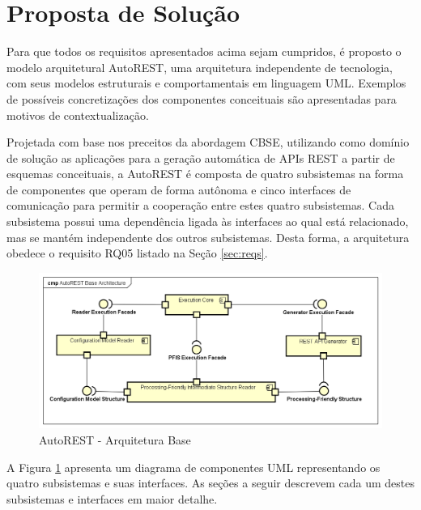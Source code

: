 
\section{Proposta de Solução}

Para que todos os requisitos apresentados acima sejam cumpridos, é proposto o modelo arquitetural AutoREST, uma arquitetura independente de tecnologia, com seus modelos estruturais e comportamentais em linguagem UML. Exemplos de possíveis concretizações dos componentes conceituais são apresentadas para motivos de contextualização.

Projetada com base nos preceitos da abordagem CBSE, utilizando como domínio de solução as aplicações para a geração automática de APIs REST a partir de esquemas conceituais, a AutoREST é composta de quatro subsistemas na forma de componentes que operam de forma autônoma e cinco interfaces de comunicação para permitir a cooperação entre estes quatro subsistemas. Cada subsistema possui uma dependência ligada às interfaces ao qual está relacionado, mas se mantém independente dos outros subsistemas. Desta forma, a arquitetura obedece o requisito RQ05 listado na Seção \ref{sec:reqs}.

\begin{figure}[htb]
    \begin{center}
        \includegraphics[scale=0.57]{imagens/AutoREST_Base_Architecture.png}
    \end{center}
	\caption{\label{fig_aba}AutoREST - Arquitetura Base}
\end{figure}

A Figura \ref{fig_aba} apresenta um diagrama de componentes UML representando os quatro subsistemas e suas interfaces. As seções a seguir descrevem cada um destes subsistemas e interfaces em maior detalhe.

